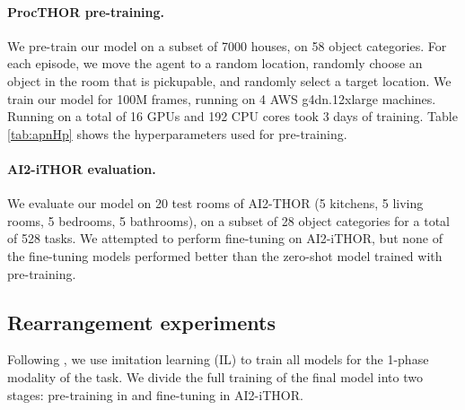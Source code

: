\paragraph{ProcTHOR pre-training.} We pre-train our model on a subset of 7000 houses, on 58 object categories. For each episode, we move the agent to a random location, randomly choose an object in the room that is pickupable, and randomly select a target location. We train our model for 100M frames, running on 4 AWS g4dn.12xlarge machines. Running on a total of 16 GPUs and 192 CPU cores took 3 days of training. Table \ref{tab:apnHp} shows the hyperparameters used for pre-training.

\paragraph{AI2-iTHOR evaluation.} We evaluate our model on 20 test rooms of AI2-THOR (5 kitchens, 5 living rooms, 5 bedrooms, 5 bathrooms), on a subset of 28 object categories for a total of 528 tasks. We attempted to perform fine-tuning on AI2-iTHOR, but none of the fine-tuning models performed better than the zero-shot model trained with \env{} pre-training.

\subsection{Rearrangement experiments}

Following \cite{weihs2021visual,khandelwal2021simple}, we use imitation learning (IL) to train all models for the 1-phase modality of the task. We divide the full training of the final model into two stages: pre-training in \env{} and fine-tuning in AI2-iTHOR.

